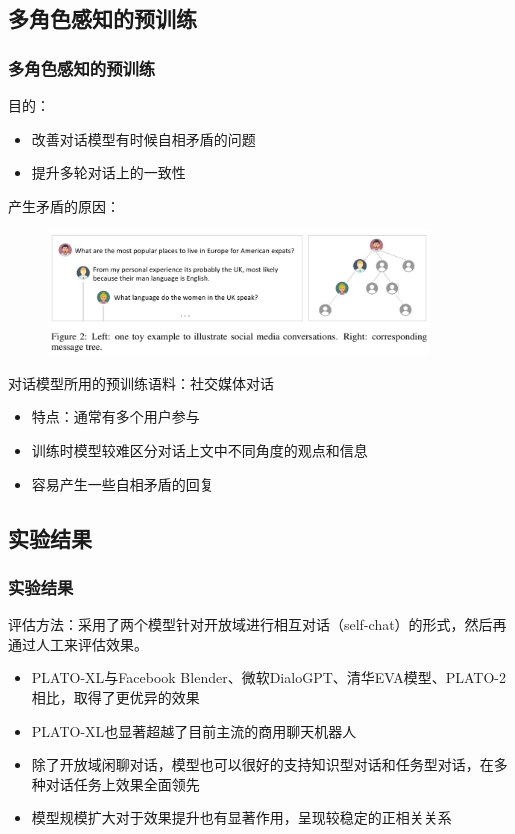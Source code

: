 \documentclass{beamer}
\begin{document}
\subsection{多角色感知的预训练}
\begin{frame}
    \frametitle{多角色感知的预训练}

    目的：

    \begin{itemize}
        \item 改善对话模型有时候自相矛盾的问题
        \item 提升多轮对话上的一致性
    \end{itemize}

    产生矛盾的原因：

    \begin{figure}
        \centering
        \includegraphics[width=0.9\textwidth]{fig/plato_example.png}
    \end{figure}

    对话模型所用的预训练语料：社交媒体对话

    \begin{itemize}
        \item 特点：通常有多个用户参与
        \item 训练时模型较难区分对话上文中不同角度的观点和信息
        \item 容易产生一些自相矛盾的回复
    \end{itemize}

\end{frame}

\subsection{实验结果}

\begin{frame}
    \frametitle{实验结果}

    评估方法：采用了两个模型针对开放域进行相互对话（self-chat）的形式，然后再通过人工来评估效果。

    \begin{itemize}
        \item PLATO-XL与Facebook Blender、微软DialoGPT、清华EVA模型、PLATO-2相比，取得了更优异的效果
        \item PLATO-XL也显著超越了目前主流的商用聊天机器人
        \item 除了开放域闲聊对话，模型也可以很好的支持知识型对话和任务型对话，在多种对话任务上效果全面领先
        \item 模型规模扩大对于效果提升也有显著作用，呈现较稳定的正相关关系
    \end{itemize}

\end{frame}
\end{document}
